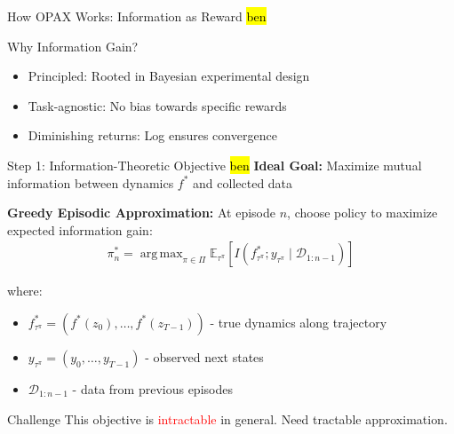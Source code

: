 \documentclass[11pt,aspectratio=169]{beamer}
\DeclareMathOperator*{\argmax}{arg\,max}
\begin{document}
\begin{frame}{How OPAX Works: Information as Reward \hl{ben}}
    \vspace{0.5em}
    \begin{block}{Why Information Gain?}
        \begin{itemize}
            \item Principled: Rooted in Bayesian experimental design
            \item Task-agnostic: No bias towards specific rewards
            \item Diminishing returns: Log ensures convergence
        \end{itemize}
    \end{block}
\end{frame}

\begin{frame}{Step 1: Information-Theoretic Objective \hl{ben}}
    \textbf{Ideal Goal:} Maximize mutual information between dynamics $f^*$ and collected data
    
    \vspace{0.5em}
    \textbf{Greedy Episodic Approximation:} At episode $n$, choose policy to maximize expected information gain:
    \begin{align}
        \pi_n^* = \argmax_{\pi \in \Pi} \mathbb{E}_{\tau^\pi}\left[I\left(f^*_{\tau^\pi}; y_{\tau^\pi} \mid \mathcal{D}_{1:n-1}\right)\right]
    \end{align}
    
    where:
    \begin{itemize}
        \item $f^*_{\tau^\pi} = (f^*(z_{0}), \ldots, f^*(z_{T-1}))$ - true dynamics along trajectory
        \item $y_{\tau^\pi} = (y_{0},\ldots, y_{T-1})$ - observed next states  
        \item $\mathcal{D}_{1:n-1}$ - data from previous episodes
    \end{itemize}
    
    \vspace{0.5em}
    \begin{alertblock}{Challenge}
        This objective is \textcolor{red}{intractable} in general. Need tractable approximation.
    \end{alertblock}
\end{frame}
\end{document}
